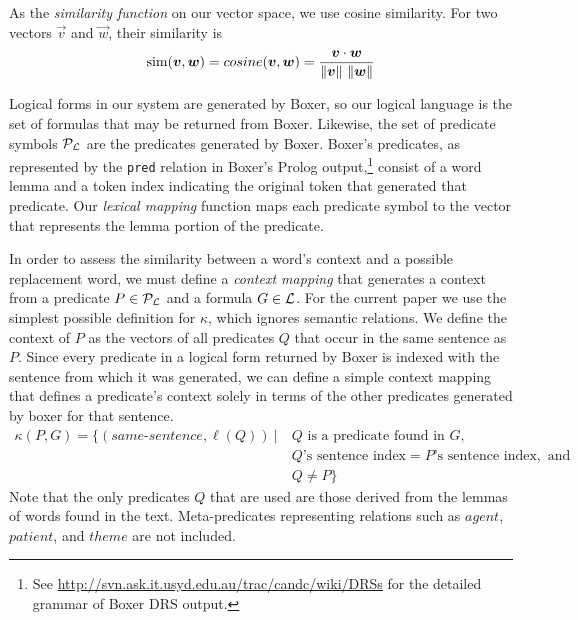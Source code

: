 As the \emph{similarity function} \simfunc on our vector space, we use cosine
similarity. For two vectors $\vec v$ and $\vec w$, their similarity is 
\[ \simfunc(\vec v, \vec w) = cosine(\vec v, \vec w) = \frac{\vec v \cdot \vec
w}{\|\vec v\|~\|\vec w\|}\]

Logical forms in our system are generated by Boxer, so our logical language
\loglang is the set of formulas that may be returned from Boxer.  Likewise, the
set of predicate symbols ${\cal{P}}_{{\cal{L}}}$ are the predicates generated by
Boxer. Boxer's predicates, as represented by the {\tt pred} relation in Boxer's
Prolog output,\footnote{See
\url{http://svn.ask.it.usyd.edu.au/trac/candc/wiki/DRSs} for the detailed
grammar of Boxer DRS output.} consist of a word lemma and a token index
indicating the original token that generated that predicate.  
Our \emph{lexical mapping} function maps each predicate symbol to the
vector that represents the lemma portion of the predicate.

In order to assess the similarity between a word's context and a possible
replacement word, we must define a \textit{context mapping} that generates a
context from a predicate $P \in {\cal{P}}_{{\cal{L}}}$ and a formula $G \in
{\cal{L}}$.  For the current paper we use the simplest possible
definition for $\kappa$, which ignores semantic relations. We define 
the context of $P$ as the
vectors of all predicates $Q$ that occur in the same sentence as $P$.
Since every predicate in a logical form returned by Boxer is indexed
with the sentence from which it was generated, we can define a simple context
mapping that defines a predicate's context solely in terms of the other
predicates generated by boxer for that sentence.
\begin{align*}
\kappa(P,G) = \{ (same\text{-}sentence, \ell(Q)) ~|
&~Q \text{ is a predicate found in } G, \\
&~Q\text{'s sentence index} = P\text{'s sentence index}, \text{ and } \\
&~Q \neq P \}
\end{align*}
Note that the only predicates $Q$ that are used are those derived from the
lemmas of words found in the text.  Meta-predicates representing relations such
as $agent$, $patient$, and $theme$ are not included.

